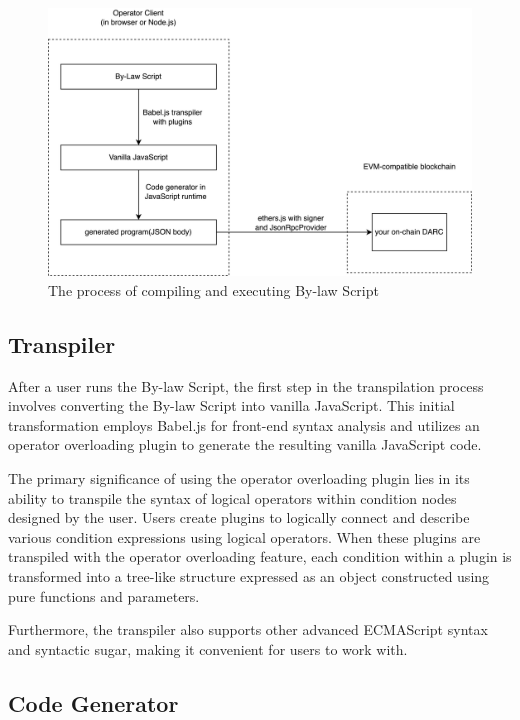 \documentclass[main.tex]{subfiles}
\begin{document}
\begin{figure}
\centering
\includegraphics[width=1\linewidth]{by-law.drawio.large.png}
\caption{\label{fig:byLaw}The process of compiling and executing By-law Script}
\end{figure}


\subsection{Transpiler}

After a user runs the By-law Script, the first step in the transpilation process involves converting the By-law Script into vanilla JavaScript. This initial transformation employs Babel.js \cite{githubGitHubBabelbabel} for front-end syntax analysis and utilizes an operator overloading plugin to generate the resulting vanilla JavaScript code.

The primary significance of using the operator overloading plugin lies in its ability to transpile the syntax of logical operators within condition nodes designed by the user. Users create plugins to logically connect and describe various condition expressions using logical operators. When these plugins are transpiled with the operator overloading feature, each condition within a plugin is transformed into a tree-like structure expressed as an object constructed using pure functions and parameters.

Furthermore, the transpiler also supports other advanced ECMAScript syntax and syntactic sugar, making it convenient for users to work with.

\subsection{Code Generator}
\end{document}
